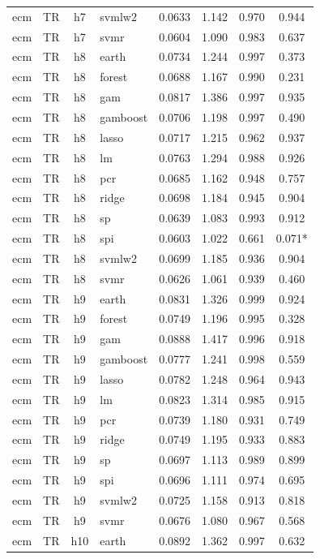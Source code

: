 \begin{ThreePartTable}
\begin{longtable}[t]{llclcccc}
ecm & TR & h7 & svmlw2 & 0.0633 & 1.142 & 0.970 & 0.944\\
ecm & TR & h7 & svmr & 0.0604 & 1.090 & 0.983 & 0.637\\
\addlinespace
ecm & TR & h8 & earth & 0.0734 & 1.244 & 0.997 & 0.373\\
ecm & TR & h8 & forest & 0.0688 & 1.167 & 0.990 & 0.231\\
ecm & TR & h8 & gam & 0.0817 & 1.386 & 0.997 & 0.935\\
ecm & TR & h8 & gamboost & 0.0706 & 1.198 & 0.997 & 0.490\\
ecm & TR & h8 & lasso & 0.0717 & 1.215 & 0.962 & 0.937\\
ecm & TR & h8 & lm & 0.0763 & 1.294 & 0.988 & 0.926\\
ecm & TR & h8 & pcr & 0.0685 & 1.162 & 0.948 & 0.757\\
ecm & TR & h8 & ridge & 0.0698 & 1.184 & 0.945 & 0.904\\
ecm & TR & h8 & sp & 0.0639 & 1.083 & 0.993 & 0.912\\
ecm & TR & h8 & spi & 0.0603 & 1.022 & 0.661 & 0.071*\\
ecm & TR & h8 & svmlw2 & 0.0699 & 1.185 & 0.936 & 0.904\\
ecm & TR & h8 & svmr & 0.0626 & 1.061 & 0.939 & 0.460\\
\addlinespace
ecm & TR & h9 & earth & 0.0831 & 1.326 & 0.999 & 0.924\\
ecm & TR & h9 & forest & 0.0749 & 1.196 & 0.995 & 0.328\\
ecm & TR & h9 & gam & 0.0888 & 1.417 & 0.996 & 0.918\\
ecm & TR & h9 & gamboost & 0.0777 & 1.241 & 0.998 & 0.559\\
ecm & TR & h9 & lasso & 0.0782 & 1.248 & 0.964 & 0.943\\
ecm & TR & h9 & lm & 0.0823 & 1.314 & 0.985 & 0.915\\
ecm & TR & h9 & pcr & 0.0739 & 1.180 & 0.931 & 0.749\\
ecm & TR & h9 & ridge & 0.0749 & 1.195 & 0.933 & 0.883\\
ecm & TR & h9 & sp & 0.0697 & 1.113 & 0.989 & 0.899\\
ecm & TR & h9 & spi & 0.0696 & 1.111 & 0.974 & 0.695\\
ecm & TR & h9 & svmlw2 & 0.0725 & 1.158 & 0.913 & 0.818\\
ecm & TR & h9 & svmr & 0.0676 & 1.080 & 0.967 & 0.568\\
\addlinespace
ecm & TR & h10 & earth & 0.0892 & 1.362 & 0.997 & 0.632\\

\end{longtable}
\end{ThreePartTable}
